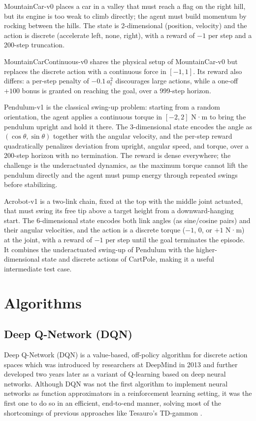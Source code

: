 \documentclass{article}
\begin{document}
MountainCar-v0 \citep{moore1990efficient} places a car in a valley that must reach a flag on the right hill, but its engine is too weak to climb directly; the agent must build momentum by rocking between the hills. The state is 2-dimensional (position, velocity) and the action is discrete (accelerate left, none, right), with a reward of $-1$ per step and a 200-step truncation.

MountainCarContinuous-v0 shares the physical setup of MountainCar-v0 but replaces the discrete action with a continuous force in $[-1, 1]$. Its reward also differs: a per-step penalty of $-0.1\,a_t^2$ discourages large actions, while a one-off $+100$ bonus is granted on reaching the goal, over a 999-step horizon.

Pendulum-v1 is the classical swing-up problem: starting from a random orientation, the agent applies a continuous torque in $[-2, 2]$ N·m to bring the pendulum upright and hold it there. The 3-dimensional state encodes the angle as $(\cos\theta, \sin\theta)$ together with the angular velocity, and the per-step reward quadratically penalizes deviation from upright, angular speed, and torque, over a 200-step horizon with no termination. The reward is dense everywhere; the challenge is the underactuated dynamics, as the maximum torque cannot lift the pendulum directly and the agent must pump energy through repeated swings before stabilizing.

Acrobot-v1 \citep{sutton1996generalization} is a two-link chain, fixed at the top with the middle joint actuated, that must swing its free tip above a target height from a downward-hanging start. The 6-dimensional state encodes both link angles (as sine/cosine pairs) and their angular velocities, and the action is a discrete torque ($-1$, $0$, or $+1$ N·m) at the joint, with a reward of $-1$ per step until the goal terminates the episode. It combines the underactuated swing-up of Pendulum with the higher-dimensional state and discrete actions of CartPole, making it a useful intermediate test case.

\section{Algorithms}
\subsection{Deep Q-Network (DQN)}
\label{sec:dqn}
Deep Q-Network (DQN) is a value-based, off-policy algorithm for discrete action spaces which was introduced by researchers at DeepMind in 2013 \citep{mnih2013playing} and further developed two years later \citep{mnih2015human} as a variant of Q-learning \citep{watkins1992q} based on deep neural networks. Although DQN was not the first algorithm to implement neural networks as function approximators in a reinforcement learning setting, it was the first one to do so in an efficient, end-to-end manner, solving most of the shortcomings of previous approaches like Tesauro's TD-gammon \citep{tesauro1995temporal}. 
\end{document}
